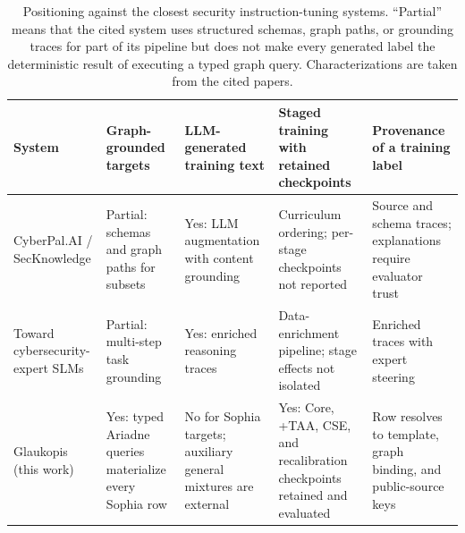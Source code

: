 \documentclass[a4paper,fleqn]{cas-dc}
\begin{document}
\begin{table}
\centering\footnotesize
\caption{Positioning against the closest security instruction-tuning systems. ``Partial'' means that the cited system uses structured schemas, graph paths, or grounding traces for part of its pipeline but does not make every generated label the deterministic result of executing a typed graph query. Characterizations are taken from the cited papers.}\label{tab:positioning}
\begin{tabularx}{\textwidth}{@{}P{2.6cm}XXXX@{}}
\toprule
System & Graph-grounded targets & LLM-generated training text & Staged training with retained checkpoints & Provenance of a training label \\
\midrule
CyberPal.AI / SecKnowledge \citep{levi2025cyberpal} & Partial: schemas and graph paths for subsets & Yes: LLM augmentation with content grounding & Curriculum ordering; per-stage checkpoints not reported & Source and schema traces; explanations require evaluator trust \\
Toward cybersecurity-expert SLMs \citep{levi2025toward} & Partial: multi-step task grounding & Yes: enriched reasoning traces & Data-enrichment pipeline; stage effects not isolated & Enriched traces with expert steering \\
Glaukopis (this work) & Yes: typed Ariadne queries materialize every Sophia row & No for Sophia targets; auxiliary general mixtures are external & Yes: Core, +TAA, CSE, and recalibration checkpoints retained and evaluated & Row resolves to template, graph binding, and public-source keys \\
\bottomrule
\end{tabularx}
\end{table}
\end{document}
